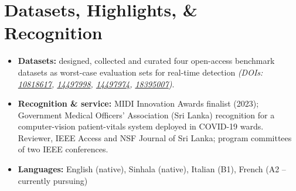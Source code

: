 \documentclass[11pt]{article}
\begin{document}
\section*{Datasets, Highlights, \& Recognition}
\begin{itemize}[leftmargin=1.2em, itemsep=-0.25em]
    \item \textbf{Datasets:} designed, collected and curated four open-access benchmark datasets as worst-case evaluation sets for real-time detection \textit{(DOIs: \href{https://doi.org/10.5281/zenodo.10818617}{10818617}, \href{https://doi.org/10.5281/zenodo.14497998}{14497998}, \href{https://doi.org/10.5281/zenodo.14497974}{14497974}, \href{https://doi.org/10.5281/zenodo.18395007}{18395007})}.
    \item \textbf{Recognition \& service:} MIDI Innovation Awards finalist (2023); Government Medical Officers' Association (Sri Lanka) recognition for a computer-vision patient-vitals system deployed in COVID-19 wards. Reviewer, IEEE Access and NSF Journal of Sri Lanka; program committees of two IEEE conferences.
    \item \textbf{Languages:} English (native), Sinhala (native), Italian (B1), French (A2 – currently pursuing)
\end{itemize}
 
\end{document}

